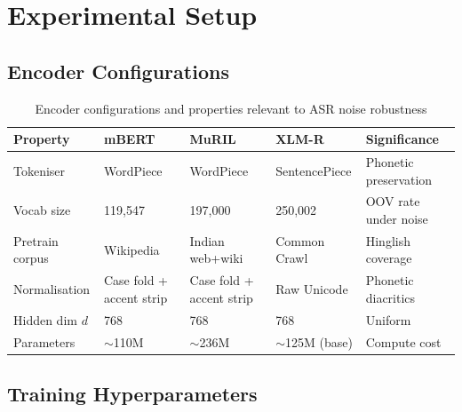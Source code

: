 \documentclass[12pt,a4paper]{report}
\begin{document}
\chapter{Experimental Setup}

\section{Encoder Configurations}

\begin{table}[H]
\centering
\caption{Encoder configurations and properties relevant to ASR noise robustness}
\label{tab:encoders}
\small
\begin{tabular}{lp{2.5cm}p{2.5cm}p{2.5cm}p{3cm}}
\toprule
\textbf{Property} & \textbf{mBERT} & \textbf{MuRIL} & \textbf{XLM-R} & \textbf{Significance}\\
\midrule
Tokeniser & WordPiece & WordPiece & SentencePiece & Phonetic preservation \\
Vocab size & 119,547 & 197,000 & 250,002 & OOV rate under noise \\
Pretrain corpus & Wikipedia & Indian web+wiki & Common Crawl & Hinglish coverage \\
Normalisation & Case fold + accent strip & Case fold + accent strip & Raw Unicode & Phonetic diacritics \\
Hidden dim $d$ & 768 & 768 & 768 & Uniform \\
Parameters & $\sim$110M & $\sim$236M & $\sim$125M (base) & Compute cost \\
\bottomrule
\end{tabular}
\end{table}

\section{Training Hyperparameters}
\end{document}
